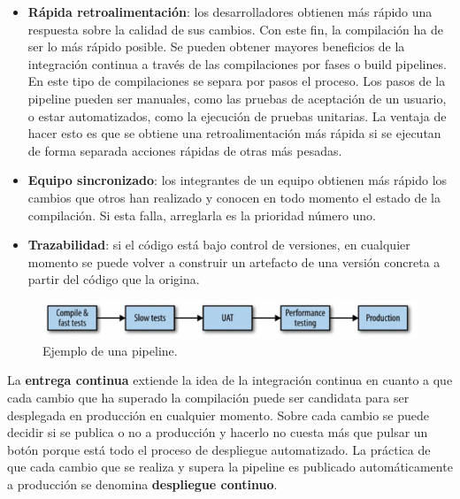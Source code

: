 \documentclass[11pt,spanish,listoffigures]{tfgetsinf}
\begin{document}
\begin{itemize}

\item \textbf{Rápida retroalimentación}: los desarrolladores obtienen más rápido una respuesta sobre la calidad de sus cambios. Con este fin, la compilación ha de ser lo más rápido posible. Se pueden obtener mayores beneficios de la integración continua a través de las compilaciones por fases o build pipelines. En este tipo de compilaciones se separa por pasos el proceso. Los pasos de la pipeline pueden ser manuales, como las pruebas de aceptación de un usuario, o estar automatizados, como la ejecución de pruebas unitarias. La ventaja de hacer esto es que se obtiene una retroalimentación más rápida si se ejecutan de forma separada acciones rápidas de otras más pesadas. \cite{Fowler2006}

\item \textbf{Equipo sincronizado}: los integrantes de un equipo obtienen más rápido los cambios que otros han realizado y conocen en todo momento el estado de la compilación. Si esta falla, arreglarla es la prioridad número uno.

\item \textbf{Trazabilidad}: si el código está bajo control de versiones, en cualquier momento se puede volver a construir un artefacto de una versión concreta a partir del código que la origina. \cite{Newman2015a}

\end{itemize}

\begin{figure}[h]
\centering
\includegraphics[scale=1]{pipeline}
\caption{Ejemplo de una pipeline. \cite{Newman2015a}}
\end{figure}

La \textbf{entrega continua} extiende la idea de la integración continua en cuanto a que cada cambio que ha superado la compilación puede ser candidata para ser desplegada en producción en cualquier momento. Sobre cada cambio se puede decidir si se publica o no a producción y hacerlo no cuesta más que pulsar un botón porque está todo el proceso de despliegue automatizado. La práctica de que cada cambio que se realiza y supera la pipeline es publicado automáticamente a producción se denomina \textbf{despliegue continuo}. \cite{Fowler2013}
\end{document}
